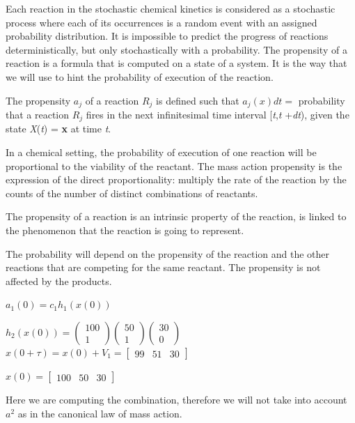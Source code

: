 Each reaction in the stochastic chemical kinetics is considered as a
stochastic process where each of its occurrences is a random event with
an assigned probability distribution. It is impossible to predict the
progress of reactions deterministically, but only stochastically with a
probability. The propensity of a reaction is a formula that is computed
on a state of a system. It is the way that we will use to hint the
probability of execution of the reaction.

The propensity $a_j$ of a reaction $R_j$ is defined such that
$a_j(x)dt=$ probability that a reaction $ R_j$  fires in the next
infinitesimal time interval {[}\emph{t},\emph{t} +\emph{dt}), given the
state \emph{X}(\emph{t}) = \textbf{x} at time \emph{t}.

In a chemical setting, the probability of execution of one reaction will
be proportional to the viability of the reactant. The mass action
propensity is the expression of the direct proportionality: multiply the
rate of the reaction by the counts of the number of distinct
combinations of reactants.

The propensity of a reaction is an intrinsic property of the reaction,
is linked to the phenomenon that the reaction is going to represent.

The probability will depend on the propensity of the reaction and the
other reactions that are competing for the same reactant. The propensity
is not affected by the products.

$a_1 (0) = c_1 h_1 (x(0))$

$h_2(x(0)) = \begin{pmatrix} 100 \\ 1 \end{pmatrix} \begin{pmatrix} 50 \\ 1 \end{pmatrix}\begin{pmatrix} 30 \\ 0 \end{pmatrix}$
$x(0+ \tau) = x(0) + V_1 = \begin{bmatrix} 99 &51& 30 \end{bmatrix}$

$x(0) = \begin{bmatrix} 100 &50& 30 \end{bmatrix}$

Here we are computing the combination, therefore we will not take into
account $a^2$ as in the canonical law of mass action.

